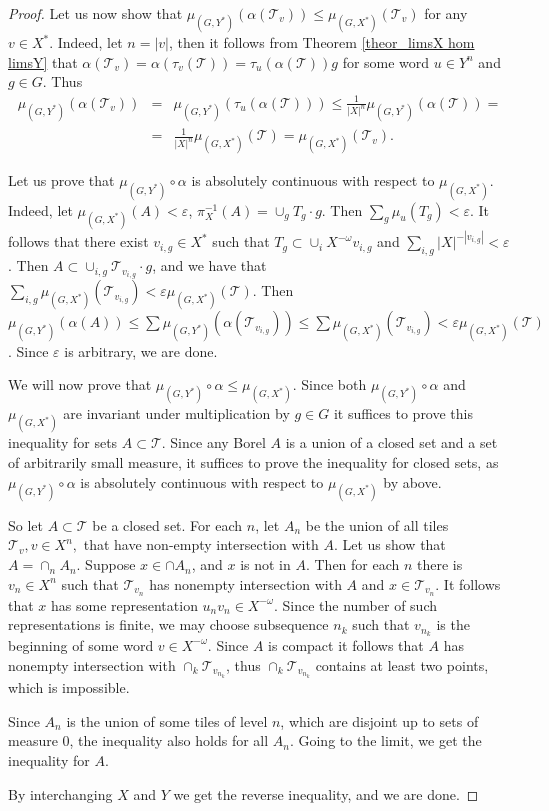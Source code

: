 \documentclass[12pt]{article}
\newcommand{\xmo}{X^{-\omega}}
\newcommand{\tile}{\mathscr{T}}
\theoremstyle{definition}
\begin{document}
\begin{proof}
Let us now show that $\mu_{(G,Y^*)}(\alpha(\tile_v))\leq\mu_{(G,X^*)}(\tile_v)$ for any $v\in X^*$.
Indeed, let $n=|v|$, then it follows from Theorem \ref{theor_limsX hom limsY} that
$\alpha(\tile_v)=\alpha(\tau_v(\tile))=\tau_u(\alpha(\tile))g$ for some word $u\in Y^n$ and $g\in
G$. Thus
\begin{eqnarray*}
\mu_{(G,Y^*)}(\alpha(\tile_v))&=&\mu_{(G,Y^*)}(\tau_u(\alpha(\tile)))\leq\frac{1}{|X|^n}\mu_{(G,Y^*)}(\alpha(\tile))=\\
&=&\frac{1}{|X|^n}\mu_{(G,X^*)}(\tile)=\mu_{(G,X^*)}(\tile_v).
\end{eqnarray*}

Let us prove that $\mu_{(G,Y^*)}\circ\alpha$ is absolutely continuous with respect to
$\mu_{(G,X^*)}$. Indeed, let $\mu_{(G,X^*)}(A)<\varepsilon$, $\pi^{-1}_{X}(A)=\cup_g T_g\cdot g$.
Then $\sum_g\mu_u(T_g)<\varepsilon$. It follows that there exist $v_{i,g}\in X^*$ such that
$T_g\subset\cup_i\xmo v_{i,g}$ and $\sum_{i,g}|X|^{-|v_{i,g}|}<\varepsilon$. Then
$A\subset\cup_{i,g}\tile_{v_{i,g}}\cdot g$, and we have that
$\sum_{i,g}\mu_{(G,X^*)}(\tile_{v_{i,g}})<\varepsilon\mu_{(G,X^*)}(\tile)$. Then
$\mu_{(G,Y^*)}(\alpha(A))\leq\sum\mu_{(G,Y^*)}(\alpha(\tile_{v_{i,g}}))\leq\sum\mu_{(G,X^*)}(\tile_{v_{i,g}})<\varepsilon\mu_{(G,X^*)}(\tile)$.
Since $\varepsilon$ is arbitrary, we are done.

We will now prove that $\mu_{(G,Y^*)}\circ\alpha\leq\mu_{(G,X^*)}$. Since both
$\mu_{(G,Y^*)}\circ\alpha$ and $\mu_{(G,X^*)}$ are invariant under multiplication by $g\in G$ it
suffices to prove this inequality for sets $A\subset\tile$. Since any Borel $A$ is a union of a
closed set and a set of arbitrarily small measure, it suffices to prove the inequality for closed
sets, as $\mu_{(G,Y^*)}\circ\alpha$ is absolutely continuous with respect to $\mu_{(G,X^*)}$ by
above.

So let $A\subset\tile$ be a closed set. For each $n$, let $A_n$ be the union of all tiles
$\tile_v,v\in X^n,$ that have non-empty intersection with $A$. Let us show that $A=\cap_n A_n$.
Suppose $x\in\cap A_n$, and $x$ is not in $A$. Then for each $n$ there is $v_n\in X^n$ such that
$\tile_{v_n}$ has nonempty intersection with $A$ and $x\in\tile_{v_n}$. It follows that $x$ has
some representation $u_nv_n\in\xmo$. Since the number of such representations is finite, we may
choose subsequence $n_k$ such that $v_{n_k}$ is the beginning of some word $v\in\xmo$. Since $A$ is
compact it follows that $A$ has nonempty intersection with $\cap_k\tile_{v_{n_k}}$, thus
$\cap_k\tile_{v_{n_k}}$ contains at least two points, which is impossible.

Since $A_n$ is the union of some tiles of level $n$, which are disjoint up to sets of measure $0$,
the inequality also holds for all $A_n$. Going to the limit, we get the inequality for $A$.

By interchanging $X$ and $Y$ we get the reverse inequality, and we are done.
\end{proof}
\end{document}
